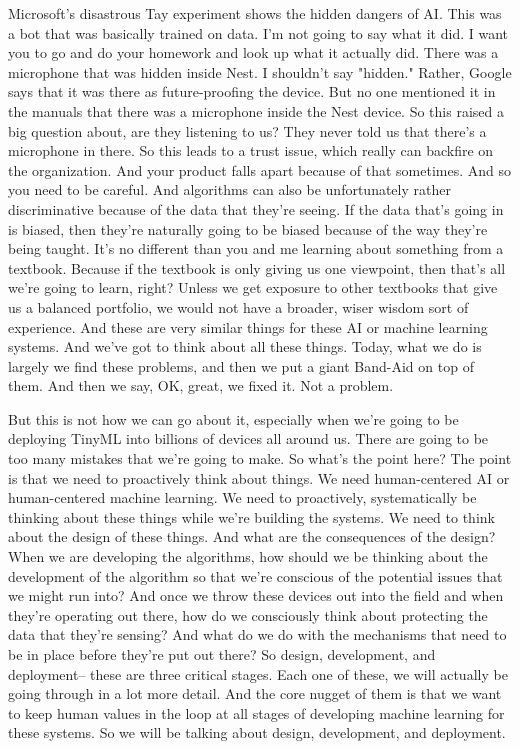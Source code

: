Microsoft's disastrous Tay experiment shows the hidden dangers of AI.
This was a bot that was basically trained on data.
I'm not going to say what it did.
I want you to go and do your homework and look up what it actually did.
There was a microphone that was hidden inside Nest.
I shouldn't say "hidden."
Rather, Google says that it was there as future-proofing the device.
But no one mentioned it in the manuals that there was
a microphone inside the Nest device.
So this raised a big question about, are they listening to us?
They never told us that there's a microphone in there.
So this leads to a trust issue, which really
can backfire on the organization.
And your product falls apart because of that sometimes.
And so you need to be careful.
And algorithms can also be unfortunately rather discriminative because
of the data that they're seeing.
If the data that's going in is biased, then they're
naturally going to be biased because of the way they're being taught.
It's no different than you and me learning about something
from a textbook.
Because if the textbook is only giving us one viewpoint, then that's all we're
going to learn, right?
Unless we get exposure to other textbooks that
give us a balanced portfolio, we would not
have a broader, wiser wisdom sort of experience.
And these are very similar things for these AI or machine learning systems.
And we've got to think about all these things.
Today, what we do is largely we find these problems,
and then we put a giant Band-Aid on top of them.
And then we say, OK, great, we fixed it.
Not a problem.


But this is not how we can go about it, especially when
we're going to be deploying TinyML into billions of devices all around us.
There are going to be too many mistakes that we're going to make.
So what's the point here?
The point is that we need to proactively think about things.
We need human-centered AI or human-centered machine learning.
We need to proactively, systematically be thinking about these things
while we're building the systems.
We need to think about the design of these things.
And what are the consequences of the design?
When we are developing the algorithms, how
should we be thinking about the development of the algorithm
so that we're conscious of the potential issues that we might run into?
And once we throw these devices out into the field
and when they're operating out there, how
do we consciously think about protecting the data that they're sensing?
And what do we do with the mechanisms that
need to be in place before they're put out there?
So design, development, and deployment-- these are three critical stages.
Each one of these, we will actually be going through in a lot more detail.
And the core nugget of them is that we want to keep human values in the loop
at all stages of developing machine learning for these systems.
So we will be talking about design, development,
and deployment.


